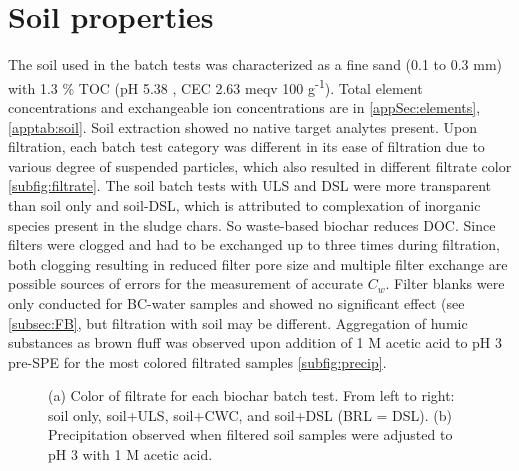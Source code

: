 \section{Soil properties}\label{sec:Soil}
The soil used in the batch tests was characterized as a fine sand (0.1 to 0.3 mm) with 1.3 \% TOC (pH 5.38 , CEC 2.63  meqv 100 g\textsuperscript{-1}). Total element concentrations and exchangeable ion concentrations are in \cref{appSec:elements}, \cref{apptab:soil}. Soil extraction showed no native target analytes present. Upon filtration, each batch test category was different in its ease of filtration due to various degree of suspended particles, which also resulted in different filtrate color \cref{subfig:filtrate}. The soil batch tests with ULS and DSL were more transparent than soil only and soil-DSL, which is attributed to complexation of inorganic species present in the sludge chars. So waste-based biochar reduces DOC. Since filters were clogged and had to be exchanged up to three times during filtration, both clogging resulting in reduced filter pore size and multiple filter exchange are possible sources of errors for the measurement of accurate $C_w$. Filter blanks were only conducted for BC-water samples and showed no significant effect (see \cref{subsec:FB}, but filtration with soil may be different. Aggregation of humic substances as brown fluff was observed upon addition of 1 M acetic acid to pH 3 pre-SPE for the most colored filtrated samples \cref{subfig:precip}.

\begin{figure}[tbh]
\hfill
{}
\caption{(a) Color of filtrate for each biochar batch test. From left to right: soil only, soil+ULS, soil+CWC, and soil+DSL (BRL = DSL). (b) Precipitation observed when filtered soil samples were adjusted to pH 3 with 1 M acetic acid.}
\label{fig:DOC_tubes}
\end{figure}


